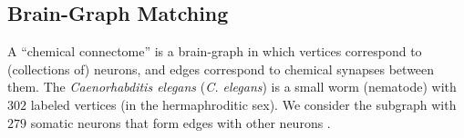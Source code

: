 \documentclass[preprint,11pt]{elsarticle}
\begin{document}



% 



\subsection{Brain-Graph Matching} %
\label{sub:connectome}




A ``chemical connectome'' is a brain-graph in which vertices correspond to (collections of) neurons, and edges correspond to chemical synapses between them. The \emph{Caenorhabditis elegans} (\emph{C. elegans}) is a small worm (nematode) with $302$ labeled vertices (in the hermaphroditic sex).  We consider the subgraph with $279$ somatic neurons that form edges with other neurons \cite{WhiteBrenner86, Varshney2011}.  
\end{document}
